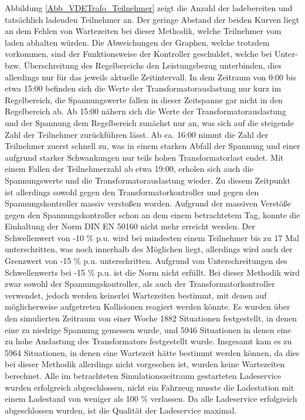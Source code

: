 Abbildung \ref{Abb_VDETrafo_Teilnehmer} zeigt die Anzahl der ladebereiten und tatsächlich ladenden Teilnehmer an. Der geringe Abstand der beiden Kurven liegt an dem Fehlen von Wartezeiten bei dieser Methodik, welche Teilnehmer vom laden abhalten würden. Die Abweichungen der Graphen, welche trotzdem vorkommen, sind der Funktionsweise der Kontroller geschuldet, welche bei Unter- bzw. Überschreitung des Regelbereichs den Leistungsbezug unterbinden, dies allerdings nur für das jeweils aktuelle Zeitintervall. 
In dem Zeitraum von 0:00 bis etwa 15:00 befinden sich die Werte der Transformatorauslastung nur kurz im Regelbereich, die Spannungswerte fallen in dieser Zeitspanne gar nicht in den Regelbereich ab. Ab 15:00 nähern sich die Werte der Transformatorauslastung und der Spannung dem Regelbereich zunächst nur an, was sich auf die steigende Zahl der Teilnehmer zurückführen lässt. Ab ca. 16:00 nimmt die Zahl der Teilnehmer zuerst schnell zu, was in einem starken Abfall der Spannung und einer aufgrund starker Schwankungen nur teils hohen Transformatorlast endet. Mit einem Fallen der Teilnehmerzahl ab etwa 19:00, erholen sich auch die Spannungswerte und die Transformatorauslastung wieder. Zu diesem Zeitpunkt ist allerdings sowohl gegen den Transformatorkontroller und gegen den Spannungskontroller massiv verstoßen worden.
Aufgrund der massiven Verstöße gegen den Spannungskontroller schon an dem einem betrachtetem Tag, konnte die Einhaltung der Norm DIN EN 50160 nicht mehr erreicht werden. Der Schwellenwert von -10 \% p.u. wird bei mindesten einem Teilnehmer bis zu 17 Mal unterschritten, was noch innerhalb des Möglichen liegt, allerdings wird auch der Grenzwert von -15 \% p.u. unterschritten. Aufgrund von Unterschreitungen des Schwellenwerts bei -15 \% p.u. ist die Norm nicht erfüllt.
Bei dieser Methodik wird zwar sowohl der Spannungskontroller, als auch der Transformatorkontroller verwendet, jedoch werden keinerlei Wartezeiten bestimmt, mit denen auf möglicherweise aufgetreten Kollisionen reagiert werden könnte. Es wurden über den simulierten Zeitraum von einer Woche 1882 Situationen festgestellt, in denen eine zu niedrige Spannung gemessen wurde, und 5946 Situationen in denen eine zu hohe Auslastung des Transformators festgestellt wurde. Insgesamt kam es zu 5964 Situationen, in denen eine Wartezeit hätte bestimmt werden können, da dies bei dieser Methodik allerdings nicht vorgesehen ist, wurden keine Wartezeiten berechnet.
Alle im betrachteten Simulationszeitraum gestarteten Ladeservice wurden erfolgreich abgeschlossen, nicht ein Fahrzeug musste die Ladestation mit einem Ladestand von weniger als 100 \% verlassen. Da alle Ladeservice erfolgreich abgeschlossen wurden, ist die Qualität der Ladeservice maximal.
